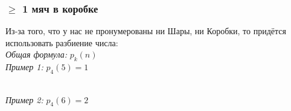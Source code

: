 \documentclass{article}
\begin{document}
            \subsubsection{$\ge$ 1 мяч в коробке}
                Из-за того, что у нас не пронумерованы ни Шары, ни Коробки, то придётся использовать разбиение числа:\\
                \textit{Общая формула:} $ p_k(n) $\\
                \textit{Пример 1:} $ p_4(5) = 1 $
                \begin{figure}[h!]
                \end{figure}\\
                \textit{Пример 2:} $ p_4(6) = 2 $
                \begin{figure}[h!]
                \end{figure}
\end{document}
